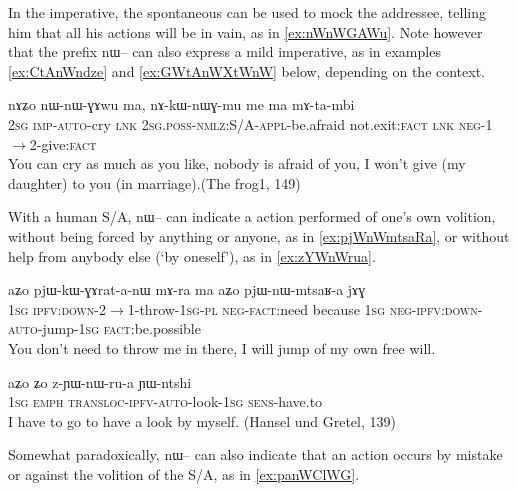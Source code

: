 \documentclass[oldfontcommands,oneside,a4paper,11pt]{article}
\newcommand{\ipa}[1]{{\phon \mbox{#1}}} %
\begin{document}
In the imperative, the spontaneous can be used to mock the addressee, telling him that all his actions will be in vain, as in \ref{ex:nWnWGAWu}. Note however that the prefix \ipa{nɯ--} can also express a mild imperative, as in examples \ref{ex:CtAnWndze} and \ref{ex:GWtAnWXtWnW} below, depending on the context.

\begin{exe}
\ex \label{ex:nWnWGAWu}
\gll 
\ipa{nɤʑo} 	\ipa{nɯ-nɯ-ɣɤwu} 	\ipa{ma,} 	\ipa{nɤ-kɯ-nɯɣ-mu} 	\ipa{me} 	\ipa{ma} 	\ipa{mɤ-ta-mbi} \\
\textsc{2sg} \textsc{imp-auto}-cry \textsc{lnk} \textsc{2sg.poss-nmlz}:S/A-\textsc{appl}-be.afraid not.exit:\textsc{fact} \textsc{lnk} \textsc{neg}-1$\rightarrow$2-give:\textsc{fact} \\
\glt You can cry as much as you like, nobody is afraid of you, I won't give (my daughter) to you (in marriage).(The frog1, 149)
\end{exe}

With a human S/A, \ipa{nɯ--} can indicate a action performed of one's own volition, without being forced by anything or anyone, as in \ref{ex:pjWnWmtsaRa}, or without help from anybody else (`by oneself'), as in \ref{ex:zYWnWrua}.

\begin{exe}
\ex \label{ex:pjWnWmtsaRa}
\gll 
\ipa{aʑo} 	\ipa{pjɯ-kɯ-ɣɤrat-a-nɯ} 	\ipa{mɤ-ra} 	\ipa{ma} 	\ipa{aʑo} 	\ipa{pjɯ-nɯ-mtsaʁ-a} 	\ipa{jɤɣ} \\
\textsc{1sg} \textsc{ipfv:down}-2$\rightarrow$1-throw-\textsc{1sg-pl} \textsc{neg-fact}:need because \textsc{1sg} \textsc{neg-ipfv:down-auto}-jump-\textsc{1sg} \textsc{fact}:be.possible \\
\glt You don't need to throw me in there, I will jump of my own free will.
\end{exe}



\begin{exe}
\ex \label{ex:zYWnWrua}
\gll
\ipa{aʑo} 	\ipa{ʑo} 	\ipa{z-ɲɯ-nɯ-ru-a} 	\ipa{ɲɯ-ntshi} \\
\textsc{1sg} \textsc{emph} \textsc{transloc-ipfv-auto}-look-\textsc{1sg} \textsc{sens}-have.to \\
\glt I have to go to have a look by myself. (Hansel und Gretel, 139)
\end{exe} 



Somewhat paradoxically, \ipa{nɯ--} can also indicate that an action occurs by mistake or against the volition of the S/A, as in \ref{ex:panWClWG}.
\end{document}
